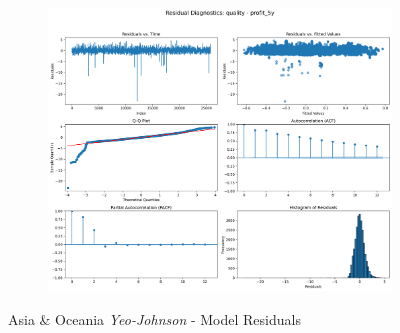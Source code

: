 \documentclass[11pt,english,a4paper,hidelinks]{book}
\begin{document}
\begin{figure}[H]
\begin{subfigure}[b]{0.32\textwidth}
    \end{subfigure}
    \hfill
    \begin{subfigure}[b]{0.32\textwidth}
        \centering
        \includegraphics[width=\textwidth]{images/code/models/linear_regression/first_model/AS/quality_profit_5y_residuals - Gaussian.png}
    \end{subfigure}
    \caption{Asia \& Oceania \textit{Yeo-Johnson} - Model Residuals}
    \label{fig:linear_regression_AS_residues_gaussian}
\end{figure}
\end{document}
